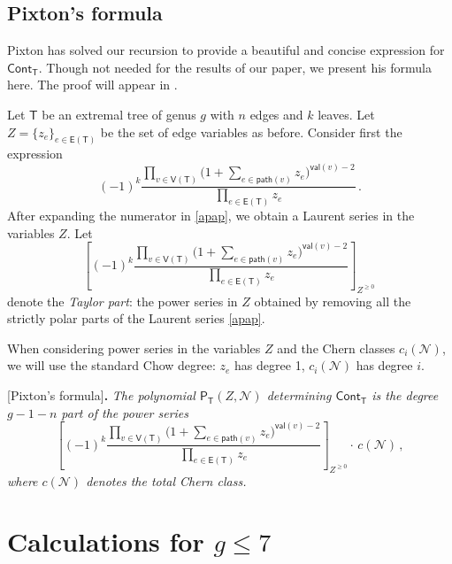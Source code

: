 \documentclass[11pt]{amsart}
\theoremstyle{definition}
\begin{document}
{\subsection{Pixton's formula}\label{Pixformula}
Pixton has solved our recursion to provide a beautiful and concise expression for 
$\mathsf{Cont}_{\mathsf{T}}$. 
Though not needed for the results of our paper, we present his formula here. The proof will appear in \cite{Pixx}.


Let $\mathsf{T}$ be an extremal tree of genus $g$
with $n$ edges and $k$ leaves. Let
$Z=\{ z_e\}_{e\in \mathsf{E}(\mathsf{T})}$
be the set of edge variables as before.
Consider first the expression
\begin{equation}
\label{apap}
(-1)^k \frac{\prod_{v\in \mathsf{V}(\mathsf{T})}
\big(1+ \sum_{e\in \mathsf{path}(v)} z_e\big)^{\mathsf{val}(v)-2}
}
{\prod_{e\in \mathsf{E}(\mathsf{T})}z_e}\, .
\end{equation}
After expanding the numerator in \eqref{apap}, we
obtain a Laurent series in the variables $Z$.
Let 
\begin{equation*}
\left[ (-1)^k \frac{\prod_{v\in \mathsf{V}(\mathsf{T})}
\big(1+ \sum_{e\in \mathsf{path}(v)} z_e\big)^{\mathsf{val}(v)-2}
}
{\prod_{e\in \mathsf{E}(\mathsf{T})}z_e} \right]_{Z^{\geq0}}\, 
\end{equation*}
denote the {\em Taylor part}: the power series  in $Z$
obtained by removing all the strictly polar parts of the
Laurent series \eqref{apap}.

When considering power series
in the variables $Z$ and the Chern classes
$c_i(\mathcal{N})$, we will use the
standard Chow degree: $z_e$ has degree 1,
$c_i(\mathcal{N})$ has degree $i$.



\vspace{8pt}
 [Pixton's formula]{\bf{.}}
{\em The polynomial $\mathsf{P}_{\mathsf{T}}(Z,\mathcal{N})$
determining $\mathsf{Cont}_{\mathsf{T}}$ is the degree
$g-1-n$ part of the power series
\begin{equation*}
\left[ (-1)^k \frac{\prod_{v\in \mathsf{V}(\mathsf{T})}
\big(1+ \sum_{e\in \mathsf{path}(v)} z_e\big)^{\mathsf{val}(v)-2}
}
{\prod_{e\in \mathsf{E}(\mathsf{T})}z_e} \right]_{Z^{\geq0}} \cdot \, c(\mathcal{N})\, , 
\end{equation*}
where $c(\mathcal{N})$ denotes the total Chern class.}

\section{Calculations for \texorpdfstring{$g\leq7$}{g<=7}}\label{lowgenus}
}
\end{document}

